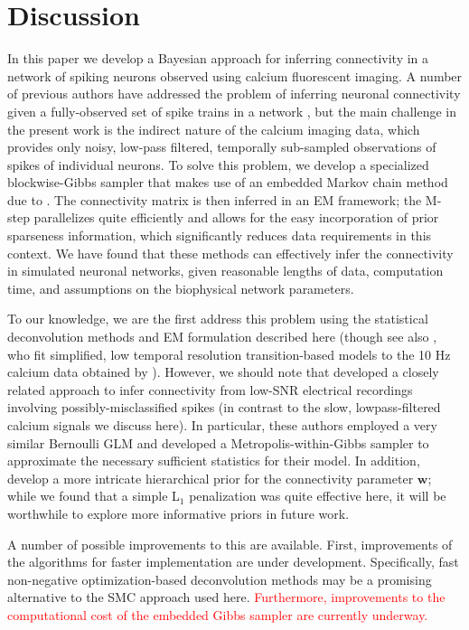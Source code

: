 \documentclass[aoas,preprint]{imsart}
\providecommand{\tr}[1]{\textcolor{red}{#1}}
\newcommand{\w}{w}
\newcommand{\bw}{\mathbf{\w}}
\begin{document}
\section{Discussion}
\label{sec:discussion}
In this paper we develop a Bayesian approach for inferring connectivity in a network of spiking neurons observed using calcium fluorescent imaging. A number of previous authors have addressed the problem of inferring neuronal connectivity given a fully-observed set of spike trains in a network \cite{BRIL88,CSK88,BRIL92,PAN03d,PAN04c,TRUC05,Rigat06,NYK06,KP06,Vidne08,Stevenson2009,Garofalo09}, but the main challenge in the present work is the indirect nature of the calcium imaging data, which provides only noisy, low-pass filtered, temporally sub-sampled observations of spikes of individual neurons. To solve this problem, we develop a specialized blockwise-Gibbs sampler that makes use of an embedded Markov chain method due to \cite{NBR03}. The connectivity matrix is then inferred in an EM framework; the M-step parallelizes quite efficiently and allows for the easy incorporation of prior sparseness information, which significantly reduces data requirements in this context. We have found that these methods can effectively infer the connectivity in simulated neuronal networks, given reasonable lengths of data, computation time, and assumptions on the biophysical network parameters.

To our knowledge, we are the first address this problem using the statistical deconvolution methods and EM formulation described here (though see also \cite{Roxin08}, who fit simplified, low temporal resolution transition-based models to the 10 Hz calcium data obtained by \cite{IkegayaYuste04}). However, we should note that \cite{Rigat06} developed a closely related approach to infer connectivity from low-SNR electrical recordings involving possibly-misclassified spikes (in contrast to the slow, lowpass-filtered calcium signals we discuss here). In particular, these authors employed a very similar Bernoulli GLM and developed a Metropolis-within-Gibbs sampler to approximate the necessary sufficient statistics for their model. In addition, \cite{Rigat06} develop a more intricate hierarchical prior for the connectivity parameter $\bw$; while we found that a simple L$_1$ penalization was quite effective here, it will be worthwhile to explore more informative priors in future work.

A number of possible improvements to this are available. First, improvements of the algorithms for faster implementation are under development. Specifically, fast non-negative optimization-based deconvolution methods may be a promising alternative \cite{Vogelstein08,Pan08b} to the SMC approach used here.  \tr{Furthermore, improvements to the computational cost of the embedded Gibbs sampler are currently underway.}
\end{document}
